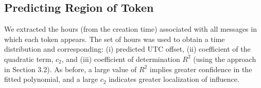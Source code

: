 \subsection{Predicting Region of Token}  \label{ms-prediction}

We extracted the  hours (from the creation time) associated with all messages in which each token appears. The set of hours  was used to obtain a time distribution and corresponding: (i) predicted UTC offset, (ii) coefficient of the quadratic term, $c_2$, and (iii) coefficient of determination $R^2$ (using the approach in Section 3.2). As before, a large value of $R^2$ implies  greater confidence in the fitted polynomial, and a large $c_2$ indicates  greater localization of influence.

\begin{figure}[htp]
   \hspace*{\fill}   %
  \hspace*{\fill}   %

\end{figure}
